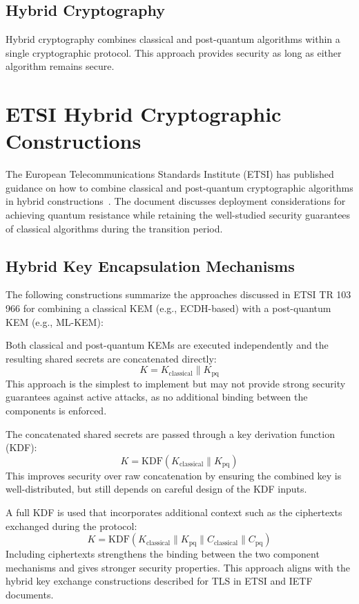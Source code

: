 \documentclass[11pt,a4paper]{article}
\begin{document}
\subsection{Hybrid Cryptography}

Hybrid cryptography combines classical and post-quantum algorithms within a single cryptographic protocol. This approach provides security as long as either algorithm remains secure.

\section{ETSI Hybrid Cryptographic Constructions}

The European Telecommunications Standards Institute (ETSI) has published guidance on how to combine classical and post-quantum cryptographic algorithms in hybrid constructions~\cite{etsi}. The document discusses deployment considerations for achieving quantum resistance while retaining the well-studied security guarantees of classical algorithms during the transition period.

\subsection{Hybrid Key Encapsulation Mechanisms}

The following constructions summarize the approaches discussed in ETSI TR 103 966 for combining a classical KEM (e.g., ECDH-based) with a post-quantum KEM (e.g., ML-KEM):

\begin{description}[style=nextline]
    \item[Concatenation Only]
    Both classical and post-quantum KEMs are executed independently and the resulting shared secrets are concatenated directly:
    \[
    K = K_{\text{classical}} \parallel K_{\text{pq}}
    \]
    This approach is the simplest to implement but may not provide strong security guarantees against active attacks, as no additional binding between the components is enforced.

    \item[Concatenation with Simple KDF]
    The concatenated shared secrets are passed through a key derivation function (KDF):
    \[
    K = \mathrm{KDF}(K_{\text{classical}} \parallel K_{\text{pq}})
    \]
    This improves security over raw concatenation by ensuring the combined key is well-distributed, but still depends on careful design of the KDF inputs.

    \item[Concatenation with Full KDF]
    A full KDF is used that incorporates additional context such as the ciphertexts exchanged during the protocol:
    \[
    K = \mathrm{KDF}(K_{\text{classical}} \parallel K_{\text{pq}} \parallel C_{\text{classical}} \parallel C_{\text{pq}})
    \]
    Including ciphertexts strengthens the binding between the two component mechanisms and gives stronger security properties. This approach aligns with the hybrid key exchange constructions described for TLS in ETSI and IETF documents.
\end{description}
\end{document}
